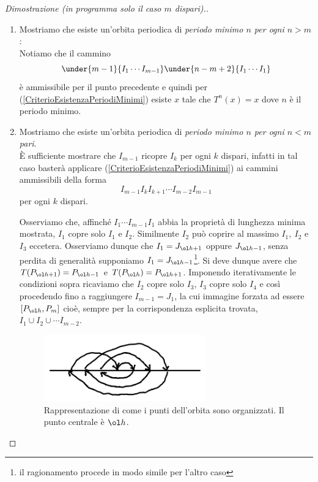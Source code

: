 \begin{proof}[Dimostrazione (in programma solo il caso $m$ dispari).]
\begin{enumerate}
\item Mostriamo che esiste un'orbita periodica di \textit{periodo minimo $n$ per ogni $n>m$}:\\
Notiamo che il cammino
\[\under{m-1}{I_1\cdots I_{m-1}}\under{n-m+2}{I_1\cdots I_1}\]
\`e ammissibile per il punto precedente e quindi per (\ref{CriterioEsistenzaPeriodiMinimi}) esiste $x$ tale che $T^{n}(x)=x$ dove $n$ \`e il periodo minimo.

\item Mostriamo che esiste un'orbita periodica di \textit{periodo minimo $n$ per ogni $n<m$ pari}.\\
\`E sufficiente mostrare che $I_{m-1}$ ricopre $I_k$ per ogni $k$ dispari, infatti in tal caso baster\`a applicare (\ref{CriterioEsistenzaPeriodiMinimi}) ai cammini ammissibili della forma
\[I_{m-1}I_k I_{k+1}\cdots I_{m-2}I_{m-1}\]
per ogni $k$ dispari.

Osserviamo che, affinch\'e $I_1\cdots I_{m-1}I_1$ abbia la propriet\`a di lunghezza minima mostrata, $I_1$ copre solo $I_1$ e $I_2$. Similmente $I_2$ pu\`o coprire al massimo $I_1,\ I_2$ e $I_3$ eccetera. Osserviamo dunque che $I_1=J_{\ol h+1}$ oppure $J_{\ol h-1}$, senza perdita di generalit\`a supponiamo $I_1=J_{\ol h-1}$\footnote{il ragionamento procede in modo simile per l'altro caso}. Si deve dunque avere che $T(P_{\ol h+1})=P_{\ol h-1}$ e $T(P_{\ol h})=P_{\ol h+1}$. Imponendo iterativamente le condizioni sopra ricaviamo che $I_2$ copre solo $I_3$, $I_3$ copre solo $I_4$ e cos\`i procedendo fino a raggiungere $I_{m-1}=J_{1}$, la cui immagine forzata ad essere $[P_{\ol h},P_m]$ cio\`e, sempre per la corrispondenza esplicita trovata, $I_1\cup I_2\cup \cdots I_{m-2}$.

\begin{figure}[!htb]
	\centering
	\includegraphics[width=7cm]{Immagini/Disegno_A.png}
	\caption{Rappresentazione di come i punti dell'orbita sono organizzati. Il punto centrale \`e $\ol h$.}
	\label{ConfigurazioneOrbita}
\end{figure}



\end{enumerate}
\end{proof}
